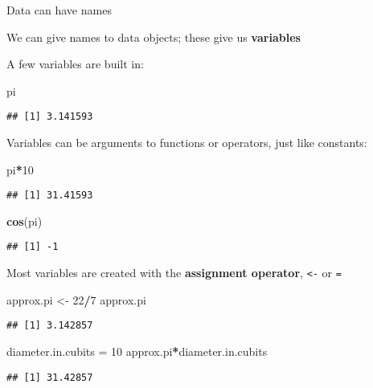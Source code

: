 \documentclass[8pt,ignorenonframetext,]{beamer}
\newenvironment{Shaded}{\begin{snugshade}}{\end{snugshade}}
\newcommand{\KeywordTok}[1]{\textcolor[rgb]{0.13,0.29,0.53}{\textbf{#1}}}
\newcommand{\DecValTok}[1]{\textcolor[rgb]{0.00,0.00,0.81}{#1}}
\newcommand{\StringTok}[1]{\textcolor[rgb]{0.31,0.60,0.02}{#1}}
\newcommand{\OperatorTok}[1]{\textcolor[rgb]{0.81,0.36,0.00}{\textbf{#1}}}
\newcommand{\NormalTok}[1]{#1}
\begin{document}
\begin{frame}[fragile]{Data can have names}

We can give names to data objects; these give us \textbf{variables}

A few variables are built in:

\begin{Shaded}
\begin{Highlighting}[]
\NormalTok{pi}
\end{Highlighting}
\end{Shaded}

\begin{verbatim}
## [1] 3.141593
\end{verbatim}

Variables can be arguments to functions or operators, just like
constants:

\begin{Shaded}
\begin{Highlighting}[]
\NormalTok{pi}\OperatorTok{*}\DecValTok{10}
\end{Highlighting}
\end{Shaded}

\begin{verbatim}
## [1] 31.41593
\end{verbatim}

\begin{Shaded}
\begin{Highlighting}[]
\KeywordTok{cos}\NormalTok{(pi)}
\end{Highlighting}
\end{Shaded}

\begin{verbatim}
## [1] -1
\end{verbatim}

\end{frame}

\begin{frame}[fragile]{}

Most variables are created with the \textbf{assignment operator},
\texttt{\textless{}-} or \texttt{=}

\begin{Shaded}
\begin{Highlighting}[]
\NormalTok{approx.pi <-}\StringTok{ }\DecValTok{22}\OperatorTok{/}\DecValTok{7}
\NormalTok{approx.pi}
\end{Highlighting}
\end{Shaded}

\begin{verbatim}
## [1] 3.142857
\end{verbatim}

\begin{Shaded}
\begin{Highlighting}[]
\NormalTok{diameter.in.cubits =}\StringTok{ }\DecValTok{10}
\NormalTok{approx.pi}\OperatorTok{*}\NormalTok{diameter.in.cubits}
\end{Highlighting}
\end{Shaded}

\begin{verbatim}
## [1] 31.42857
\end{verbatim}

\end{frame}
\end{document}
